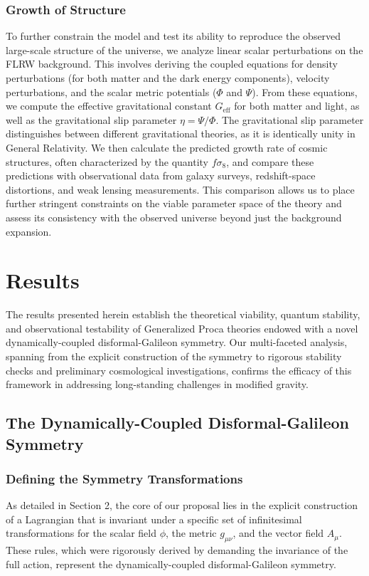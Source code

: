 \documentclass[twocolumn]{aastex631}
\begin{document}
\subsubsection{Growth of Structure}
To further constrain the model and test its ability to reproduce the observed large-scale structure of the universe, we analyze linear scalar perturbations on the FLRW background. This involves deriving the coupled equations for density perturbations (for both matter and the dark energy components), velocity perturbations, and the scalar metric potentials ($\Phi$ and $\Psi$). From these equations, we compute the effective gravitational constant $G_{\text{eff}}$ for both matter and light, as well as the gravitational slip parameter $\eta = \Psi/\Phi$. The gravitational slip parameter distinguishes between different gravitational theories, as it is identically unity in General Relativity. We then calculate the predicted growth rate of cosmic structures, often characterized by the quantity $f\sigma_8$, and compare these predictions with observational data from galaxy surveys, redshift-space distortions, and weak lensing measurements. This comparison allows us to place further stringent constraints on the viable parameter space of the theory and assess its consistency with the observed universe beyond just the background expansion.

\section{Results}
\label{sec:results}
The results presented herein establish the theoretical viability, quantum stability, and observational testability of Generalized Proca theories endowed with a novel dynamically-coupled disformal-Galileon symmetry. Our multi-faceted analysis, spanning from the explicit construction of the symmetry to rigorous stability checks and preliminary cosmological investigations, confirms the efficacy of this framework in addressing long-standing challenges in modified gravity.

\subsection{The Dynamically-Coupled Disformal-Galileon Symmetry}

\subsubsection{Defining the Symmetry Transformations}
As detailed in Section 2, the core of our proposal lies in the explicit construction of a Lagrangian that is invariant under a specific set of infinitesimal transformations for the scalar field $\phi$, the metric $g_{\mu\nu}$, and the vector field $A_\mu$. These rules, which were rigorously derived by demanding the invariance of the full action, represent the dynamically-coupled disformal-Galileon symmetry.
\end{document}
